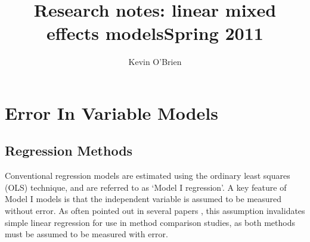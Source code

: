 \documentclass[12pt, a4paper]{report}
\title{Research notes: linear mixed effects models}
\author{ } \date{ }
\theoremstyle{plain}
\theoremstyle{definition}
\theoremstyle{remark}
\begin{document}
	\author{Kevin O'Brien}
	\title{Spring 2011}
	
	
	\tableofcontents



%


\chapter{Error In Variable Models}
\section{Regression Methods}
Conventional regression models are estimated using the ordinary least squares (OLS) technique, and are referred to as `Model I regression'\citep{CornCoch,ludbrook97}. A key feature of Model I models is that the independent variable is assumed to be measured
without error. As often pointed out in several papers \citep{BA83,ludbrook97}, this assumption invalidates simple linear
regression for use in method comparison studies, as both methods must be assumed to be measured with error.
\end{document}
